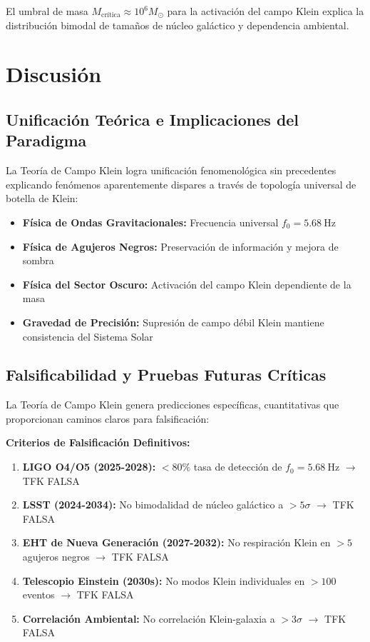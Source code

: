 \documentclass[aps,prl,twocolumn,showpacs,superscriptaddress,groupedaddress]{revtex4-1}
\newcommand{\TFK}{TFK}
\newcommand{\fcero}{f_0}
\newcommand{\msol}{M_{\odot}}
\begin{document}
El umbral de masa $M_{\text{crítica}} \approx 10^6 \msol$ para la activación del campo Klein explica la distribución bimodal de tamaños de núcleo galáctico y dependencia ambiental.

\section{\label{sec:discusion}Discusión}

\subsection{Unificación Teórica e Implicaciones del Paradigma}

La Teoría de Campo Klein logra unificación fenomenológica sin precedentes explicando fenómenos aparentemente dispares a través de topología universal de botella de Klein:

\begin{itemize}
\item \textbf{Física de Ondas Gravitacionales:} Frecuencia universal $\fcero = \SI{5.68}{\hertz}$
\item \textbf{Física de Agujeros Negros:} Preservación de información y mejora de sombra
\item \textbf{Física del Sector Oscuro:} Activación del campo Klein dependiente de la masa
\item \textbf{Gravedad de Precisión:} Supresión de campo débil Klein mantiene consistencia del Sistema Solar
\end{itemize}

\subsection{Falsificabilidad y Pruebas Futuras Críticas}

La Teoría de Campo Klein genera predicciones específicas, cuantitativas que proporcionan caminos claros para falsificación:

\textbf{Criterios de Falsificación Definitivos:}
\begin{enumerate}
\item \textbf{LIGO O4/O5 (2025-2028):} $<80\%$ tasa de detección de $\fcero = \SI{5.68}{\hertz}$ $\rightarrow$ \TFK{} FALSA
\item \textbf{LSST (2024-2034):} No bimodalidad de núcleo galáctico a $>5\sigma$ $\rightarrow$ \TFK{} FALSA
\item \textbf{EHT de Nueva Generación (2027-2032):} No respiración Klein en $>5$ agujeros negros $\rightarrow$ \TFK{} FALSA
\item \textbf{Telescopio Einstein (2030s):} No modos Klein individuales en $>100$ eventos $\rightarrow$ \TFK{} FALSA
\item \textbf{Correlación Ambiental:} No correlación Klein-galaxia a $>3\sigma$ $\rightarrow$ \TFK{} FALSA
\end{enumerate}
\end{document}
